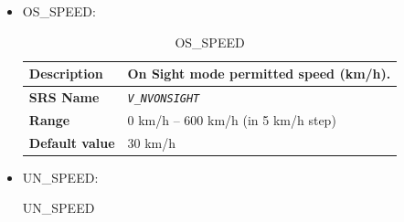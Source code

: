 \documentclass{template/openetcs}
\begin{document}
\begin{itemize}
\begin{longtable}{|l|l|}
				\hline
				
			\end{longtable}
			
			
		\item OS\_SPEED:
		
			\begin{longtable}{|l|l|}
				\caption{OS\_SPEED}\\ 							
				\hline
				
					\begin{minipage}[t]{0.22\linewidth} \textbf{Description}	\end{minipage} 
				&	\begin{minipage}[t]{0.78\linewidth} On Sight mode permitted speed (km/h). \end{minipage} \\
				
				\hline
				
					\begin{minipage}[t]{0.22\linewidth} \textbf{SRS Name}	\end{minipage} 
				&	\begin{minipage}[t]{0.78\linewidth} \emph{\texttt{V\_NVONSIGHT}} \end{minipage} \\
				
				\hline
														
					\begin{minipage}[t]{0.22\linewidth} \textbf{Range}	\end{minipage} 
				&	\begin{minipage}[t]{0.78\linewidth} 0 km/h – 600 km/h (in 5 km/h step) \end{minipage} \\
				
				\hline
										
					\begin{minipage}[t]{0.22\linewidth} \textbf{Default value}	\end{minipage} 
				&	\begin{minipage}[t]{0.78\linewidth} 30 km/h \end{minipage} \\
				
				\hline
				
			\end{longtable}			 
			
		\item UN\_SPEED:
			\begin{longtable}{|l|l|}
				\caption{UN\_SPEED}\\ 										
				\hline
				

\end{longtable}
\end{itemize}
\end{document}
